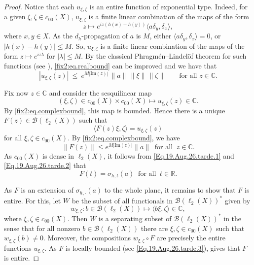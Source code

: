 \documentclass[11pt]{amsart}
\newcommand{\R}{\mathbb{R}}
\newcommand{\C}{\mathbb{C}}
\newcommand{\cB}{\mathcal{B}}
\numberwithin{equation}{section}
\theoremstyle{definition}
\theoremstyle{remark}
\begin{document}
\begin{proof}
 Notice that each $u_{\xi,\zeta}$ is an entire function of exponential type. Indeed, for a given $\xi,\zeta\in c_{00}(X)$, $u_{\xi,\zeta}$   is   a finite linear combination of the maps of the form \[z\mapsto e^{iz(h(x)-h(y))}\langle a\delta_y,\delta_x\rangle,\] where $x,y\in X$. As the $d_h$-propagation of $a$ is $M$, either $\langle a\delta_y,\delta_x\rangle=0$, or $|h(x)-h(y)|\leq M$. So, $u_{\xi,\zeta}$   is   a finite linear combination of the maps of the form $z\mapsto e^{iz\lambda}$ for $|\lambda|\leq M$.  By the classical Phragm\'en--Lindel\"of theorem for such functions (see \cite[Theorem 6.2.4]{Boas}), \eqref{fix2:eq.realbound} can be improved and we have that
\begin{equation}\label{fix2:eq.complexbound}
|u_{\xi,\zeta}(z)|\ \le\ e^{M|\mathrm{Im}(z)|}\,\|a\|\,\|\xi\|\,\|\zeta\|
\qquad\text{for all }z\in\mathbb{C}.
\end{equation}

Fix now $z\in\mathbb{C}$ and consider the sesquilinear map   \[(\xi,\zeta)\in c_{00}(X)\times c_{00}(X)\mapsto u_{\xi,\zeta}(z)\in \C.\] By \eqref{fix2:eq.complexbound}, this map is bounded. Hence there is a unique $F(z)\in\mathcal{B}(\ell_2(X))$ such that
\begin{equation}\label{Eq.19.Aug.26.tarde.2}
\langle F(z)\xi,\zeta\rangle=u_{\xi,\zeta}(z)\end{equation}
for all $\xi,\zeta\in c_{00}(X)$. By \eqref{fix2:eq.complexbound}, we have
\begin{equation}\label{Eq.19.Aug.26.tarde.3}\|F(z)\|\le e^{M|\mathrm{Im}(z)|}\|a\| \ \text{ for all } \ z\in \C.
\end{equation}
As $c_{00}(X)$ is dense in $\ell_2(X)$, it follows from   \eqref{Eq.19.Aug.26.tarde.1} and \eqref{Eq.19.Aug.26.tarde.2} that   \[F(t)= \sigma_{h,t}(a)\ \text{ for all } \ t\in \R.\]

As $F$ is an extension of $\sigma_{h,\cdot }(a)$ to the whole plane, it remains to show that   $F$ is entire. For this, let $W$ be the subset of all functionals in $\cB(\ell_2(X))^*$   given by
\[w_{\xi,\zeta}\colon b\in\mathcal{B}(\ell_2(X))\mapsto\langle b\xi,\zeta\rangle\in \C,\] where $\xi,\zeta\in c_{00}(X)$. Then $W$ is a   separating subset of $\mathcal{B}(\ell_2(X))^*$ in the sense that for all nonzero $b\in \cB(\ell_2(X))$ there are $\xi,\zeta\in c_{00}(X)$ such that   $w_{\xi,\zeta}(b)\neq 0$.  Moreover, the compositions $w_{\xi,\zeta}\circ F$   are precisely the entire functions $u_{\xi,\zeta}$. As   $F$ is locally bounded (see \eqref{Eq.19.Aug.26.tarde.3}),    \cite[Theorem 3.1]{ArendtNikolski} gives that   $F$ is entire.
\end{proof}
\end{document}
